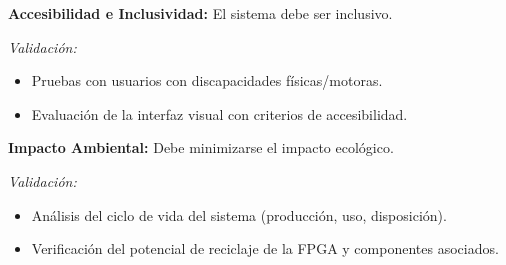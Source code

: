 \documentclass[conference]{IEEEtran}
\begin{document}
\textbf{Accesibilidad e Inclusividad:} El sistema debe ser inclusivo.

\textit{Validación:}
\begin{itemize}
	\item Pruebas con usuarios con discapacidades físicas/motoras.
	\item Evaluación de la interfaz visual con criterios de accesibilidad.
\end{itemize}

\textbf{Impacto Ambiental:} Debe minimizarse el impacto ecológico.

\textit{Validación:}
\begin{itemize}
	\item Análisis del ciclo de vida del sistema (producción, uso, disposición).
	\item Verificación del potencial de reciclaje de la FPGA y componentes asociados.
\end{itemize}


\printbibliography
\end{document}

